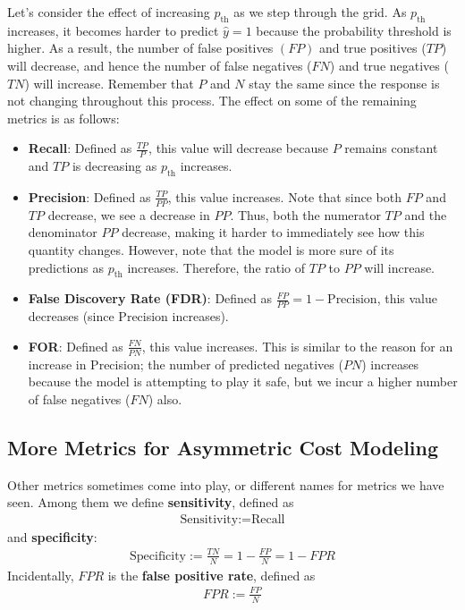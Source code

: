 \documentclass[12pt, a4paper]{article}
\theoremstyle{definition}
\begin{document}
	Let's consider the effect of increasing $p_{\text{th}}$ as we step through
	the grid. As $p_{\text{th}}$ increases, it becomes harder to predict
	$\hat{y} = 1$ because the probability threshold is higher. As a result,
	the number of false positives $(FP)$ and true positives ($TP$) will decrease,
	and hence the number of false negatives ($FN$) and true negatives ($TN$) will
	increase. Remember that $P$ and $N$ stay the same since the response is not
	changing throughout this process. The effect on some of the remaining metrics
	is as follows:
	\begin{itemize}
		\item \textbf{Recall}: Defined as $\frac{TP}{P}$, this value will decrease
		because $P$ remains constant and $TP$ is decreasing as $p_{\text{th}}$ increases.
		\item \textbf{Precision}: Defined as $\frac{TP}{PP}$, this value increases.
		Note that since both $FP$ and $TP$ decrease, we see a decrease in $PP$.
		Thus, both the numerator $TP$ and the denominator $PP$ decrease,
		making it harder to immediately see how this quantity changes. However,
		note that the model is more sure of its predictions as $p_{\text{th}}$
		increases. Therefore, the ratio of $TP$ to $PP$ will increase.
		\item \textbf{False Discovery Rate (FDR)}: Defined as $\frac{FP}{PP} = 1 - \text{Precision}$, this value decreases (since Precision increases).
		\item \textbf{FOR}: Defined as $\frac{FN}{PN}$, this value increases.
		This is similar to the reason for an increase in Precision; the number
		of predicted negatives ($PN$) increases because the model is attempting
		to play it safe, but we incur a higher number of false negatives ($FN$)
		also.
	\end{itemize}
	\subsection{More Metrics for Asymmetric Cost Modeling}
	Other metrics sometimes come into play, or different names for
	metrics we have seen. Among them we define \textbf{sensitivity},
	defined as
	\begin{align*}
		\text{Sensitivity} := \text{Recall}
	\end{align*}
	and \textbf{specificity}:
	\begin{align*}
		\text{Specificity} := \frac{TN}{N} = 1 - \frac{FP}{N} = 1 - FPR
	\end{align*}
	Incidentally, $FPR$ is the \textbf{false positive rate}, defined as
	\begin{align*}
		FPR := \frac{FP}{N}
	\end{align*}
\end{document}
